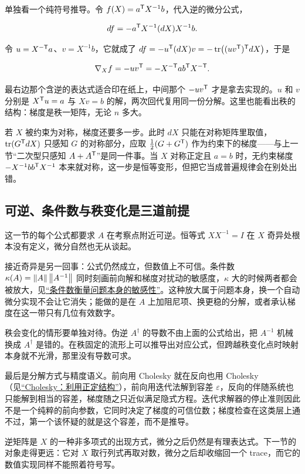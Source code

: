 单独看一个纯符号推导。令 \(f(X)=a^{\mathsf{T}}X^{-1}b\)，代入逆的微分公式，

\[
df=-a^{\mathsf{T}}X^{-1}(dX)X^{-1}b.
\]

令 \(u=X^{-\mathsf{T}}a\)、\(v=X^{-1}b\)，它就成了 \(df=-u^{\mathsf{T}}(dX)v=-\operatorname{tr}\bigl((uv^{\mathsf{T}})^{\mathsf{T}}dX\bigr)\)，于是

\[
\nabla_Xf=-uv^{\mathsf{T}}=-X^{-\mathsf{T}}ab^{\mathsf{T}}X^{-\mathsf{T}}.
\]

最右边那个含逆的表达式适合印在纸上，中间那个 \(-uv^{\mathsf{T}}\) 才是拿去实现的。\(u\) 和 \(v\) 分别是 \(X^{\mathsf{T}}u=a\) 与 \(Xv=b\) 的解，两次回代复用同一份分解。这里也能看出秩的结构：梯度是秩一矩阵，无论 \(n\) 多大。

若 \(X\) 被约束为对称，梯度还要多一步。此时 \(dX\) 只能在对称矩阵里取值，\(\operatorname{tr}(G^{\mathsf{T}}dX)\) 只感知 \(G\) 的对称部分，应取 \(\tfrac12(G+G^{\mathsf{T}})\) 作为约束下的梯度——与上一节``二次型只感知 \(A+A^{\mathsf{T}}\)''是同一件事。当 \(X\) 对称正定且 \(a=b\) 时，无约束梯度 \(-X^{-1}bb^{\mathsf{T}}X^{-1}\) 本来就对称，这一步是恒等变形，但把它当成普遍规律会在别处出错。

\subsection{可逆、条件数与秩变化是三道前提}

这一节的每个公式都要求 \(A\) 在考察点附近可逆。恒等式 \(XX^{-1}=I\) 在 \(X\) 奇异处根本没有定义，微分自然也无从谈起。

接近奇异是另一回事：公式仍然成立，但数值上不可信。条件数 \(\kappa(A)=\left\lVert A\right\rVert\left\lVert A^{-1}\right\rVert\) 同时刻画前向解和梯度对扰动的敏感度，\(\kappa\) 大的时候两者都会被放大，见\hyperref[sec:08-Numerical-Analysis/01-Floating-Point-and-Error/03]{``条件数衡量问题本身的敏感性''}。这种放大属于问题本身，换一个自动微分实现不会让它消失；能做的是在 \(A\) 上加阻尼项、换更稳的分解，或者承认梯度在这一带只有几位有效数字。

秩会变化的情形要单独对待。伪逆 \(A^{\dagger}\) 的导数不由上面的公式给出，把 \(A^{-1}\) 机械换成 \(A^{\dagger}\) 是错的。在秩固定的流形上可以推导出对应公式，但跨越秩变化点时映射本身就不光滑，那里没有导数可求。

最后是分解方式与精度语义。前向用 Cholesky 就在反向也用 Cholesky（见\hyperref[sec:08-Numerical-Analysis/05-Numerical-Linear-Algebra/03]{``Cholesky：利用正定结构''}），前向用迭代法解到容差 \(\varepsilon\)，反向的伴随系统也只能解到相当的容差，梯度随之只近似满足隐式方程。迭代求解器的停止准则因此不是一个纯粹的前向参数，它同时决定了梯度的可信位数；梯度检查在这类层上通不过，第一个该怀疑的就是这个容差，而不是推导。

逆矩阵是 \(X\) 的一种非多项式的出现方式，微分之后仍然是有理表达式。下一节的对象走得更远：它对 \(X\) 取行列式再取对数，微分之后却收缩回一个 trace，而它的数值实现同样不能照着符号写。
